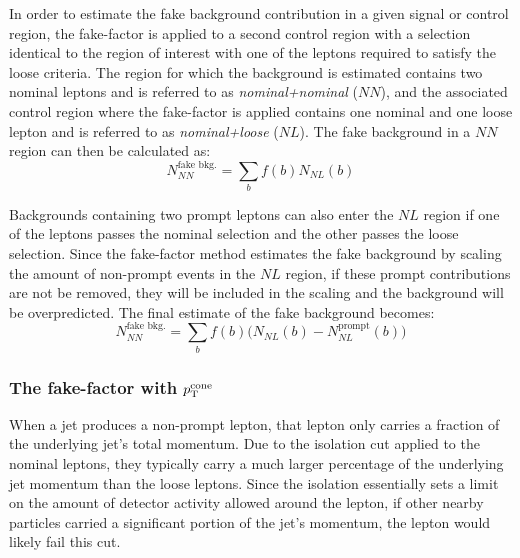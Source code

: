 In order to estimate the fake background contribution in a given signal or control region, the fake-factor is applied to a second control region with a selection identical to the region of interest with one of the leptons required to satisfy the loose criteria.
The region for which the background is estimated contains two nominal leptons and is referred to as \emph{nominal+nominal} ($NN$), and the associated control region where the fake-factor is applied contains one nominal and one loose lepton and is referred to as \emph{nominal+loose} ($NL$).
The fake background in a $NN$ region can then be calculated as:
\begin{equation}
N_{NN}^{\textrm{fake\ bkg.}} = \sum\limits_{b}f(b) N_{NL}(b)
\label{eq:ssww13tev_ff_bkg_nosub}
\end{equation}

Backgrounds containing two prompt leptons can also enter the $NL$ region if one of the leptons passes the nominal selection and the other passes the loose selection.
Since the fake-factor method estimates the fake background by scaling the amount of non-prompt events in the $NL$ region, if these prompt contributions are not be removed, they will be included in the scaling and the background will be overpredicted.
The final estimate of the fake background becomes:
\begin{equation}
N_{NN}^{\textrm{fake\ bkg.}} = \sum\limits_{b}f(b) \big(N_{NL}(b) - N_{NL}^{\textrm{prompt}}(b)\big)
\label{eq:ssww13tev_ff_bkg}
\end{equation}

%
\subsubsection{The fake-factor with $p_{\mathrm{T}}^{\textrm{cone}}$}\label{ssww13tev:ff_method_ptcone}
When a jet produces a non-prompt lepton, that lepton only carries a fraction of the underlying jet's total momentum.
Due to the isolation cut applied to the nominal leptons, they typically carry a much larger percentage of the underlying jet momentum than the loose leptons. %
Since the isolation essentially sets a limit on the amount of detector activity allowed around the lepton, if other nearby particles carried a significant portion of the jet's momentum, the lepton would likely fail this cut.

